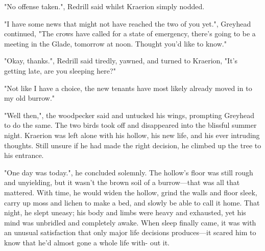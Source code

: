 "No offense taken.", Redrill said whilst Kraerion simply nodded.

"I have some news that might not have reached the two of you yet.", Greyhead continued, "The crows have called for a state of emergency, there's going to be a meeting in the Glade, tomorrow at noon. Thought you'd like to know."

"Okay, thanks.", Redrill said tiredly, yawned, and turned to Kraerion, "It's getting late, are you sleeping here?" 

"Not like I have a choice, the new tenants have most likely already moved in to my old burrow."

"Well then,", the woodpecker said and untucked his wings, prompting Greyhead to do the same. The two birds took off and disappeared into the blissful summer night. Kraerion was left alone with his hollow, his new life, and his ever intruding thoughts. Still unsure if he had made the right decision, he climbed up the tree to his entrance.

"One day was today.", he concluded solemnly. The hollow's floor was still rough and unyielding, but it wasn't the brown soil of a burrow---that was all that mattered. With time, he would widen the hollow, grind the walls and floor sleek, carry up moss and lichen to make a bed, and slowly be able to call it home. That night, he slept uneasy; his body and limbs were heavy and exhausted, yet his mind was unbridled and completely awake. When sleep finally came, it was with an unusual satisfaction that only major life decisions produces---it scared him to know that he'd almost gone a whole life with- 
\newpage
\setcounter{page}{15}
out it.


